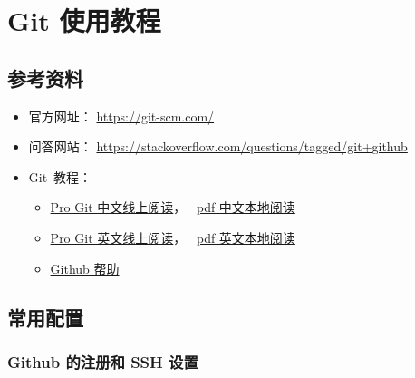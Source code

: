 \documentclass[
    11pt,
    base=hide,
    cite=authoryear,
    device=phone,
    lang=cn,
    mode=simple,
    result=answer,
    toc=onecol,
]{elegantbook_sierxue}
\begin{document}



\chapter{Git 使用教程}%
\label{cha:git-tips}

\section{参考资料}%
\label{sec:git-refs}

\begin{itemize}
    \item 官方网址： \href{https://git-scm.com/}{https://git-scm.com/}
    \item 问答网站：
        \href{https://stackoverflow.com/questions/tagged/git+github}
        {https://stackoverflow.com/questions/tagged/git+github}
    \item Git~教程：
        \begin{itemize}
            \item \href{https://git-scm.com/book/zh/v2}
                {Pro Git 中文线上阅读}，~%
                \href{books/progit_v2.1.31_zh.pdf}{pdf 中文本地阅读}
            \item \href{https://git-scm.com/book/en/v2}
                {Pro Git 英文线上阅读}，~%
                \href{books/progit_v2.1.177_en.pdf}{pdf 英文本地阅读}
            \item \href{https://help.github.com/en/github}{Github 帮助}
        \end{itemize}
\end{itemize}

\newpage
\section{常用配置}%
\label{sec:git-settings}

\subsection{Github 的注册和 SSH 设置}%
\label{sub:git-ssh}
\end{document}

